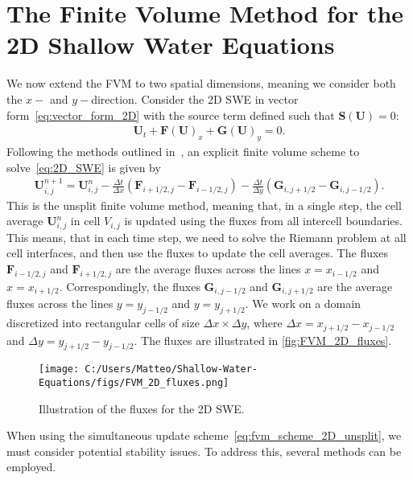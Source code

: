 \section{The Finite Volume Method for the 2D Shallow Water Equations}
We now extend the FVM to two spatial dimensions, meaning we consider both the $x-$ and $y-$direction.
Consider the 2D SWE in vector form~\eqref{eq:vector_form_2D} with the source term defined such that $\mathbf{S(U)} = 0$:
\begin{align}\label{eq:2D_SWE}
    \mathbf{U}_t + \mathbf{F(U)}_x + \mathbf{G(U)}_y = 0.
\end{align}
Following the methods outlined in~\cite{Toro2009-Riemann}, an explicit finite volume scheme to solve~\eqref{eq:2D_SWE} is given by
\begin{align}\label{eq:fvm_scheme_2D_unsplit}
    \mathbf{U}_{i,j}^{n+1} = \mathbf{U}_{i,j}^n - \frac{\Delta t}{\Delta x}(\mathbf{F}_{i+1/2,j} - \mathbf{F}_{i-1/2,j}) - \frac{\Delta t}{\Delta y}(\mathbf{G}_{i,j+1/2} - \mathbf{G}_{i,j-1/2}).
\end{align}
This is the unsplit finite volume method, meaning that, in a single step, the cell average $\mathbf{U}_{i,j}^n$ in cell $V_{i,j}$ is updated using the fluxes from all intercell boundaries.
This means, that in each time step, we need to solve the Riemann problem at all cell interfaces, and then use the fluxes to update the cell averages.
The fluxes $\mathbf{F}_{i-1/2,j}$ and $\mathbf{F}_{i+1/2,j}$ are the average fluxes across the lines $x = x_{i-1/2}$ and $x = x_{i+1/2}$.
Correspondingly, the fluxes $\mathbf{G}_{i,j-1/2}$ and $\mathbf{G}_{i,j+1/2}$ are the average fluxes across the lines $y = y_{j-1/2}$ and $y = y_{j+1/2}$.
We work on a domain discretized into rectangular cells of size $\Delta x \times \Delta y$, where $\Delta x = x_{j + 1/2} - x_{j - 1/2} $ and $\Delta y = y_{j + 1/2} - y_{j - 1/2}$.
The fluxes are illustrated in \autoref{fig:FVM_2D_fluxes}.
\begin{figure}[H]
    \centering
    \texttt{[image: C:/Users/Matteo/Shallow-Water-Equations/figs/FVM\_2D\_fluxes.png]}
    \caption{Illustration of the fluxes for the 2D SWE.}\label{fig:FVM_2D_fluxes}
\end{figure}
When using the simultaneous update scheme~\eqref{eq:fvm_scheme_2D_unsplit}, we must consider potential stability issues.
To address this, several methods can be employed.

